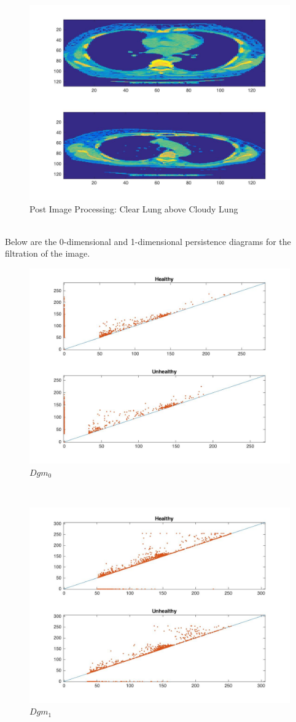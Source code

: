 \documentclass[12pt]{report}
\begin{document}
\begin{figure}[H]
\centering
	\includegraphics[width=0.8\linewidth]{tSIm.jpg}
	\caption{Post Image Processing: Clear Lung above Cloudy Lung}
\end{figure}\newline
\\
Below are the 0-dimensional and 1-dimensional persistence diagrams for the filtration of the image.
\begin{figure}[H]
\centering
	\includegraphics[width=0.8\linewidth]{0dimpersTs.jpg}
	\caption{$Dgm_0$}
\end{figure}\newline
\\
\begin{figure}[H]
\centering
	\includegraphics[width=0.8\linewidth]{1dimpersTS.jpg}
	\caption{$Dgm_1$}
\end{figure}\newline
\\
\end{document}
